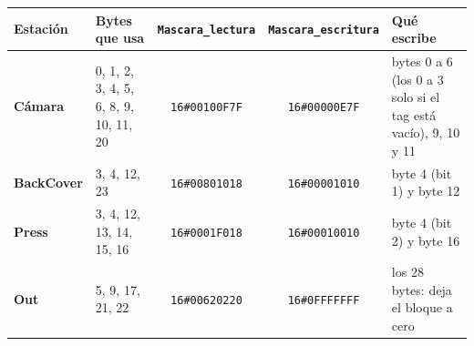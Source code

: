 \begin{tabularx}{\textwidth}{>{\bfseries}l p{3.1cm} c c X}
\toprule
Estación & Bytes que usa & \texttt{Mascara\_lectura} & \texttt{Mascara\_escritura} & Qué escribe \\
\midrule
Cámara & 0, 1, 2, 3, 4, 5, 6, 8, 9, 10, 11, 20 & \texttt{16\#00100F7F} & \texttt{16\#00000E7F} & bytes 0 a 6 (los 0 a 3 solo si el tag está vacío), 9, 10 y 11 \\
BackCover & 3, 4, 12, 23 & \texttt{16\#00801018} & \texttt{16\#00001010} & byte 4 (bit 1) y byte 12 \\
Press & 3, 4, 12, 13, 14, 15, 16 & \texttt{16\#0001F018} & \texttt{16\#00010010} & byte 4 (bit 2) y byte 16 \\
Out & 5, 9, 17, 21, 22 & \texttt{16\#00620220} & \texttt{16\#0FFFFFFF} & los 28 bytes: deja el bloque a cero \\
\bottomrule
\end{tabularx}
